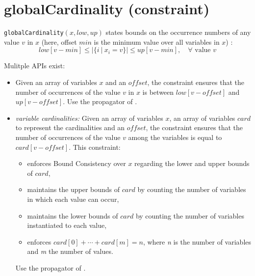 \label{globalcardinality}
\hypertarget{globalcardinality}{}

\section{globalCardinality (constraint)}\label{globalcardinality:globalcardinalityconstraint}\hypertarget{globalcardinality:globalcardinalityconstraint}{}
\begin{notedef}
  \texttt{globalCardinality}$(x,low, up)$ states bounds on the occurrence numbers of any value $v$ in $x$ (here, offset $min$ is the minimum value over all variables in $x$) :
$$low[v-min]\le|\{i\ |\ x_i=v\}|\le up[v-min],\quad\forall \text{ value } v$$   
\end{notedef}

Mulitple APIs exist:
\begin{itemize}
	\item Given an array of variables $x$ and an $offset$, the constraint ensures that the number of occurrences of the value $v$ in $x$ is between $low[v-offset]$ and $up[v-offset]$. Use the propagator of \cite{QuimperCP03}.
	\item \emph{variable cardinalities:} Given an array of variables $x$, an array of variables $card$ to represent the cardinalities and an $offset$, the constraint ensures that the number of occurrences of the value $v$ among the variables is equal to $card[v-offset]$. This constraint:
      \begin{itemize}
      \item enforces Bound Consistency over $x$ regarding the lower and upper bounds of $card$, 
      \item maintains the upper bounds of $card$ by counting the number of variables in which each value can occur, 
      \item maintains the lower bounds of $card$ by counting the number of variables instantiated to each value, 
      \item enforces $card[0] + \cdots + card[m] = n$, where \emph{n} is the number of variables and \emph{m} the number of values.
      \end{itemize}
	Use the propagator of \cite{QuimperCP03}.      

\end{itemize}

